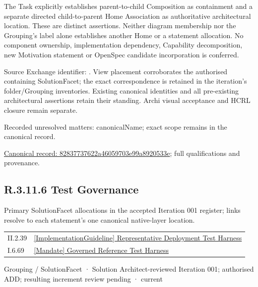 The Task explicitly establishes parent-to-child Composition as containment and
a separate directed child-to-parent Home Association as authoritative architectural
location. These are distinct assertions. Neither diagram membership nor the
Grouping's label alone establishes another Home or a statement allocation.
No component ownership, implementation dependency, Capability decomposition,
new Motivation statement or OpenSpec candidate incorporation is conferred.



Source Exchange identifier: \texttt{}. View placement corroborates
the authorised containing SolutionFacet; the exact correspondence is retained in the
iteration's folder/Grouping inventories. Existing canonical identities and all
pre-existing architectural assertions retain their standing. Archi visual
acceptance and HCRL closure remain separate.


{\small Recorded unresolved matters: canonicalName; exact scope remains in the canonical record.}\par
{\footnotesize \href{../../../../../../../continuum/grouping/82837737622a46059703e99a8920533e.md}{Canonical record: 82837737622a46059703e99a8920533e}; full qualifications and provenance.}\par
\subsection*{R.3.11.6 Test Governance}
\label{navigation:R.3.11.6}

Primary SolutionFacet allocations in the accepted Iteration 001 register; links resolve to each statement’s one canonical native-layer location.\par
\begin{longtable}{p{.22\linewidth}p{.73\linewidth}}
II.2.39 & \hyperref[element:13ce74b78d624dd09c4401fafc911f67]{[ImplementationGuideline] Representative Deployment Test Harness} \\
I.6.69 & \hyperref[element:5ce1ef8baaf84848979ff6c9ccf6ca91]{[Mandate] Governed Reference Test Harness} \\
\end{longtable}
\label{element:7eceab6d8a9741708d438a7760103c69}
{\small Grouping / SolutionFacet · Solution Architect-reviewed Iteration 001; authorised ADD; resulting increment review pending · current}\par

